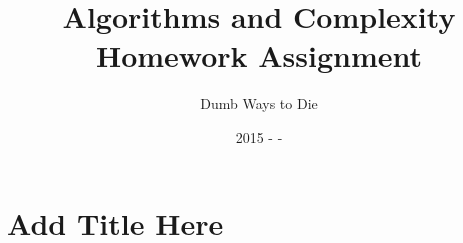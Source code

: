 \documentclass[12pt,a4]{article}
\begin{document}
\date{
	2015
	-
	-
}

\author{Dumb Ways to Die}

\title{Algorithms and Complexity\\
  Homework Assignment 
  \\
}
\maketitle

\setcounter{section}{
}
\section{Add Title Here}


\end{document}
